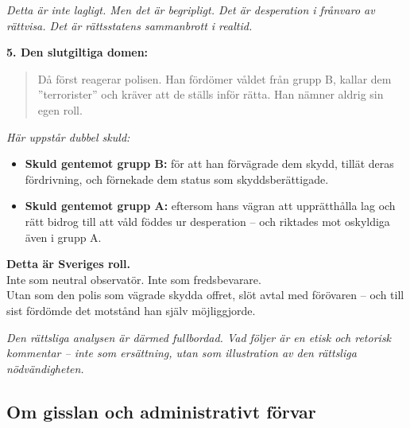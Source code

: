 \textit{Detta är inte lagligt. Men det är begripligt. Det är desperation i frånvaro av rättvisa. Det är rättsstatens sammanbrott i realtid.}

\textbf{5. Den slutgiltiga domen:}
\begin{quote}
Då först reagerar polisen. Han fördömer våldet från grupp B, kallar dem ”terrorister” och kräver att de ställs inför rätta. Han nämner aldrig sin egen roll.
\end{quote}

\textit{Här uppstår dubbel skuld:}
\begin{itemize}
    \item \textbf{Skuld gentemot grupp B:} för att han förvägrade dem skydd, tillät deras fördrivning, och förnekade dem status som skyddsberättigade.

    \item \textbf{Skuld gentemot grupp A:} eftersom hans vägran att upprätthålla lag och rätt bidrog till att våld föddes ur desperation – och riktades mot oskyldiga även i grupp A.
\end{itemize}

\textbf{Detta är Sveriges roll.}\\
Inte som neutral observatör. Inte som fredsbevarare.\\
Utan som den polis som vägrade skydda offret, slöt avtal med förövaren – och till sist fördömde det motstånd han själv möjliggjorde.

\vspace{1em}
\noindent\textit{Den rättsliga analysen är därmed fullbordad. Vad följer är en etisk och retorisk kommentar – inte som ersättning, utan som illustration av den rättsliga nödvändigheten.}



\subsection{Om gisslan och administrativt förvar}

